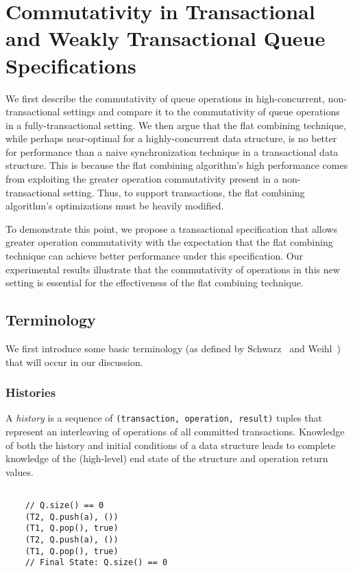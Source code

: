 \chapter{Commutativity in Transactional and Weakly Transactional Queue Specifications}
\label{commutativity}

We first describe the commutativity of queue operations in high-concurrent, non-transactional settings and compare it to the commutativity of queue operations in a fully-transactional setting. We then argue that the flat combining technique, while perhaps near-optimal for a highly-concurrent data structure, is no better for performance than a naive synchronization technique in a transactional data structure. This is because the flat combining algorithm's high performance comes from exploiting the greater operation commutativity present in a non-transactional setting. Thus, to support transactions, the flat combining algorithm's optimizations must be heavily modified. 

To demonstrate this point, we propose a transactional specification that allows greater operation commutativity with the expectation that the flat combining technique can achieve better performance under this specification. Our experimental results illustrate that the commutativity of operations in this new setting is essential for the effectiveness of the flat combining technique.

\section{Terminology}
We first introduce some basic terminology (as defined by Schwarz~\cite{schwarz} and Weihl~\cite{weihl}) that will occur in our discussion.

\subsection{Histories}
\begin{defn}
    A \emph{history} is a sequence of \texttt{(transaction, operation, result)} tuples that represent an interleaving of operations of all committed transactions. Knowledge of both the history and initial conditions of a data structure leads to complete knowledge of the (high-level) end state of the structure and operation return values.

\begin{eg}
    \singlespacing   

    \begin{lstlisting}

    // Q.size() == 0 
    (T2, Q.push(a), ())
    (T1, Q.pop(), true)
    (T2, Q.push(a), ())
    (T1, Q.pop(), true)
    // Final State: Q.size() == 0 
    \end{lstlisting}
    \doublespacing
\end{eg}

\end{defn}

